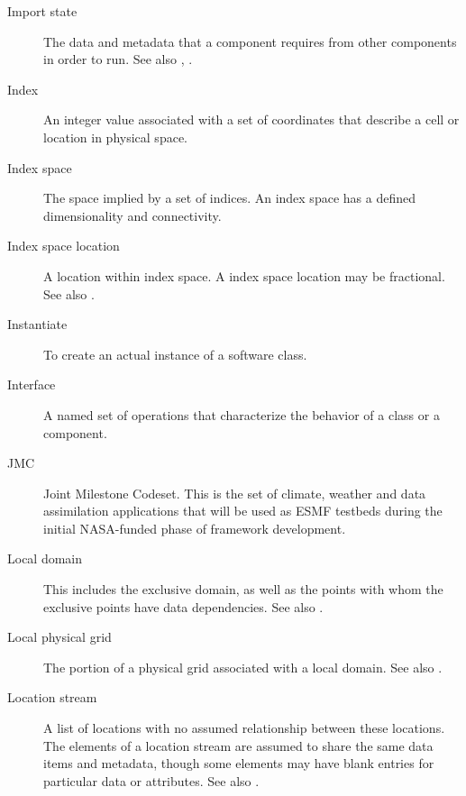 \begin{description}
\item[Import state] \label{glos:ImportState} The data and metadata 
  that a component requires from other components in order to run.  
  See also , .

\item[Index] \label{glos:Index} An integer value associated with a set
  of coordinates that describe a cell or location in physical space.

\item[Index space] \label{glos:IndexSpace} The space implied 
  by a set of indices.  An index space has a defined dimensionality and 
  connectivity.

\item[Index space location] \label{glos:IndexSpaceloc} 
  A location within index space.  A index space location may be fractional.
  See also .

\item[Instantiate] \label{glos:Instantiate}
  To create an actual instance of a software class.

\item[Interface] \label{glos:Interface}
  A named set of operations that characterize the behavior of a class
  or a component.

\item[JMC] \label{glos:JMC} 
  Joint Milestone Codeset.  This is the set of climate, weather and
  data assimilation applications that will be used as ESMF testbeds 
  during the initial NASA-funded phase of framework development.

\item[Local domain] \label{glos:LocalDomain} This includes the exclusive 
  domain, as well as the points with whom the exclusive points have data 
  dependencies. See also .

\item[Local physical grid] \label{glos:LocPhysGrid} The portion of a 
  physical grid associated with a local domain.
  See also .  

\item[Location stream] \label{glos:LocStream} A list of
  locations with no assumed relationship between these locations.  The
  elements of a location stream are assumed to share the same data
  items and metadata, though some elements may have blank entries for
  particular data or attributes. See also .


\end{description}

